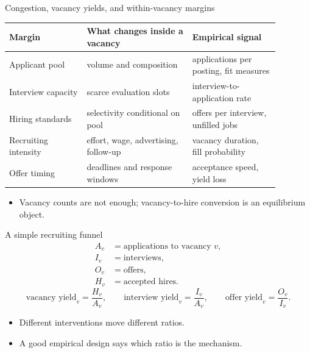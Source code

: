 \documentclass[aspectratio=169,11pt]{beamer}
\begin{document}
\begin{frame}{Congestion, vacancy yields, and within-vacancy margins}
\small
\begin{tabular}{p{0.25\linewidth} p{0.34\linewidth} p{0.29\linewidth}}
\toprule
Margin & What changes inside a vacancy & Empirical signal \\
\midrule
Applicant pool & volume and composition & applications per posting, fit measures \\
Interview capacity & scarce evaluation slots & interview-to-application rate \\
Hiring standards & selectivity conditional on pool & offers per interview, unfilled jobs \\
Recruiting intensity & effort, wage, advertising, follow-up & vacancy duration, fill probability \\
Offer timing & deadlines and response windows & acceptance speed, yield loss \\
\bottomrule
\end{tabular}
\vspace{0.25cm}
\begin{itemize}
    \item Vacancy counts are not enough; vacancy-to-hire conversion is an equilibrium object.
\end{itemize}
\end{frame}

\begin{frame}{A simple recruiting funnel}
\begin{align*}
  A_v &= \text{applications to vacancy } v, \\
  I_v &= \text{interviews}, \\
  O_v &= \text{offers}, \\
  H_v &= \text{accepted hires}.
\end{align*}
\[
  \text{vacancy yield}_v = \frac{H_v}{A_v},
  \qquad
  \text{interview yield}_v = \frac{I_v}{A_v},
  \qquad
  \text{offer yield}_v = \frac{O_v}{I_v}.
\]
\begin{itemize}
    \item Different interventions move different ratios.
    \item A good empirical design says which ratio is the mechanism.
\end{itemize}
\end{frame}
\end{document}
